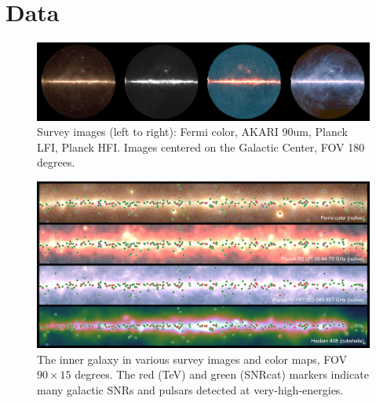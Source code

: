 \renewcommand{\thefootnote}{\arabic{footnote}}

\section{Data}

\begin{figure}[tb]
  \centerline{\includegraphics[width=\textwidth]{figures/four_images}}
  \caption{Survey images (left to right): Fermi color, AKARI 90um, Planck LFI, Planck HFI. Images centered on the Galactic Center, FOV 180 degrees.}
  \label{fig:four_images}
\end{figure}



\begin{figure}[tb]
  \centerline{\includegraphics[width=\textwidth]{figures/galactic_region_NEW}}
  \caption{The inner galaxy in various survey images and color maps, FOV $90 \times 15$ degrees. The red (TeV) and green (SNRcat) markers indicate many galactic SNRs and pulsars detected at very-high-energies.}
  \label{fig:galactic}
\end{figure}

